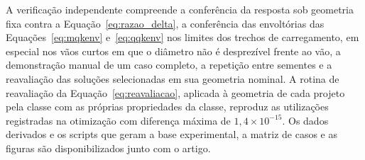 A verificação independente compreende a conferência da resposta sob geometria fixa contra a Equação~\eqref{eq:razao_delta}, a conferência das envoltórias das Equações~\eqref{eq:mqkenv} e~\eqref{eq:qqkenv} nos limites dos trechos de carregamento, em especial nos vãos curtos em que o diâmetro não é desprezível frente ao vão, a demonstração manual de um caso completo, a repetição entre sementes e a reavaliação das soluções selecionadas em sua geometria nominal. A rotina de reavaliação da Equação~\eqref{eq:reavaliacao}, aplicada à geometria de cada projeto pela classe com as próprias propriedades da classe, reproduz as utilizações registradas na otimização com diferença máxima de $1{,}4\times10^{-15}$. Os dados derivados e os scripts que geram a base experimental, a matriz de casos e as figuras são disponibilizados junto com o artigo.
